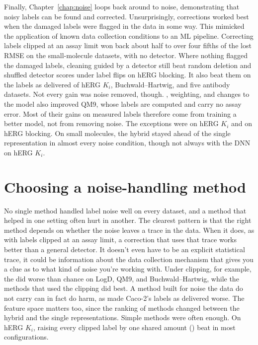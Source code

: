 Finally, Chapter~\ref{chap:noise} loops back around to noise, demonstrating that noisy labels can be found and corrected. Unsurprisingly, corrections worked best when the damaged labels were flagged in the data in some way. This mimicked the application of known data collection conditions to an ML pipeline. Correcting labels clipped at an assay limit won back about half to over four fifths of the lost RMSE on the small-molecule datasets, with no detector. Where nothing flagged the damaged labels, cleaning guided by a detector still beat random deletion and shuffled detector scores under label flips on hERG blocking. It also beat them on the labels as delivered of hERG $K_i$, Buchwald--Hartwig, and five antibody datasets. Not every gain was noise removed, though. , weighting, and changes to the model also improved QM9, whose labels are computed and carry no assay error. Most of their gains on measured labels therefore come from training a better model, not from removing noise. The exceptions were  on hERG $K_i$ and on hERG blocking. On small molecules, the hybrid stayed ahead of the single representation in almost every noise condition, though not always with the DNN on hERG $K_i$.

\section{Choosing a noise-handling method}\label{sec:discussion:noise}\label{sec:discussion:conditional}\label{sec:discussion:simple}

No single method handled label noise well on every dataset, and a method that helped in one setting often hurt in another. The clearest pattern is that the right method depends on whether the noise leaves a trace in the data. When it does, as with labels clipped at an assay limit, a correction that uses that trace works better than a general detector. It doesn't even have to be an explicit statistical trace, it could be information about the data collection mechanism that gives you a clue as to what kind of noise you're working with. Under clipping, for example, the  did worse than chance on LogD, QM9, and Buchwald--Hartwig, while the methods that used the clipping did best. A method built for noise the data do not carry can in fact do harm, as  made Caco-2's labels as delivered worse. The feature space matters too, since the ranking of methods changed between the hybrid and the single representations. Simple methods were often enough. On hERG $K_i$, raising every clipped label by one shared amount () beat  in most configurations.


